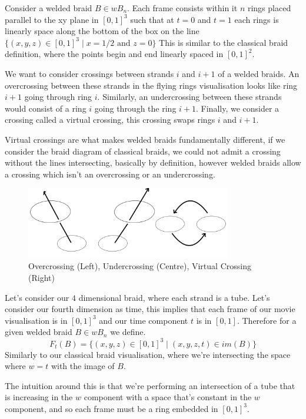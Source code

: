 Consider a welded braid \( B \in wB_n \).
Each frame consists within it \( n \) rings placed parallel to the xy plane in \( [0, 1]^3 \) such that at \( t = 0 \) and \( t = 1 \) each rings is linearly space along the bottom of the box on the line \( \{ (x, y, z) \in [0, 1]^3 \mid x = 1 / 2 \text{ and } z = 0 \} \)
This is similar to the classical braid definition, where the points begin and end linearly spaced in \( [0, 1]^2 \). 

We want to consider crossings between strands \( i \) and \( i + 1 \) of a welded braids.
An overcrossing between these strands in the flying rings visualisation looks like ring \( i + 1 \) going through ring \( i \). 
Similarly, an undercrossing between these strands would consist of a ring \( i \) going through the ring \( i + 1 \). 
Finally, we consider a crossing called a virtual crossing, this crossing swaps rings \( i \) and \( i + 1 \). 

Virtual crossings are what makes welded braids fundamentally different, if we consider the braid diagram of classical braids, we could not admit a crossing without the lines intersecting, basically by definition, however welded braids allow a crossing which isn't an overcrossing or an undercrossing. 

\begin{figure}[H]
    \centering
    \includegraphics[width=0.8\textwidth]{images/welded_braids/0_welded_rings_crossings.png}
    \caption{Overcrossing (Left), Undercrossing (Centre), Virtual Crossing (Right)}
    \label{fig:welded_rings_overcrossing_undercrossing}
\end{figure}

\begin{Remark}
Let's consider our \( 4 \) dimensional braid, where each strand is a tube. 
Let's consider our fourth dimension as time, this implies that each frame of our movie visualisation is in \( [0, 1]^3 \) and our time component \( t \) is in \( [0, 1] \). 
Therefore for a given welded braid \( B \in wB_n \) we define.
\[ F_t(B) = \{ (x, y, z) \in [0, 1]^3 \mid (x, y, z, t) \in im(B) \} \]
Similarly to our classical braid visualisation, where we're intersecting the space where \( w = t \) with the image of \( B \). 

The intuition around this is that we're performing an intersection of a tube that is increasing in the \( w \) component with a space that's constant in the \( w \) component, and so each frame must be a ring embedded in \( [0, 1]^3 \). 
\end{Remark}

